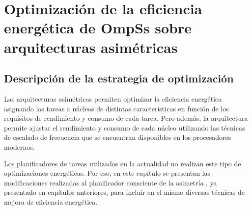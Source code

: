 \cleardoublepage

\chapter{Optimización de la eficiencia energética de OmpSs sobre arquitecturas asimétricas}
\label{ch:chapter5}

\section{Descripción de la estrategia de optimización}

Las arquitecturas asimétricas permiten optimizar la eficiencia energética
asignando las tareas a núcleos de distintas características en función de
los requisitos de rendimiento y consumo de cada tarea. Pero además, la
arquitectura permite ajustar el rendimiento y consumo de cada núcleo
utilizando las técnicas de escalado de frecuencia que se encuentran
disponibles en los procesadores modernos.

Los planificadores de tareas utilizados en la actualidad no realizan este
tipo de optimizaciones energéticas. Por eso, en este capítulo se presentan
las modificaciones realizadas al planificador consciente de la asimetría
\botlev, ya presentado en capítulos anteriores, para incluir en el mismo
diversas técnicas de mejora de eficiencia energética.




